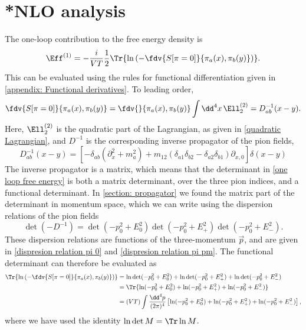 \section{*NLO analysis}

The one-loop contribution to the free energy density is
%
\begin{equation}
    \label{one loop free energy}
    \Eff^{(1)}
    = - \frac{i}{V T} \frac{1}{2}
    \Tr{\ln\left( -\fdv{S[\pi = 0]}{\pi_a(x), \pi_b(y)} \right)}.
\end{equation}
%
This can be evaluated using the rules for functional differentiation given in \autoref{appendix: Functional derivatives}.
To leading order,
%
\begin{align}
    \fdv{S[\pi = 0]}{\pi_a(x), \pi_b(y)}
    = \fdv{}{\pi_a(x), \pi_b(y)}
    \int \dd^4 x \, \Ell^{(2)}_2
    = D_{ab}^{-1}(x - y).
\end{align}
%
Here, $\Ell^{(2)}_2$ is the quadratic part of the Lagrangian, as given in \autoref{quadratic Lagrangian}, and $D^{-1}$ is the corresponding inverse propagator of the pion fields,
\begin{equation}
    D_{ab}^{-1}(x-y) = 
    \left[
        - \delta_{ab}(\partial_x^2 + m^2_a)
        + m_{12}(\delta_{a1} \delta_{b2} - \delta_{a2}\delta_{b1}) \partial_{x, 0}
    \right] \delta(x-y)
\end{equation}
%
The inverse propagator is a matrix, which means that the determinant in \autoref{one loop free energy} is both a matrix determinant, over the three pion indices, and a functional determinant.
In \autoref{section: propagator} we found the matrix part of the determinant in momentum space, which we can write using the dispersion relations of the pion fields
\begin{equation}
    \det(- D^{-1}) = \det(-p_0^2 + E_0^2) \det(-p_0^2 + E_+^2) \det(-p_0^2 + E_-^2).
\end{equation}
%
These dispersion relations are functions of the three-momentum $\vec p$, and are given in \autoref{dispresion relation pi 0} and \autoref{dispresion relation pi pm}.
The functional determinant can therefore be evaluated as
%
\begin{align}
    \nonumber
    \Tr{\ln\left( -\fdv{S[\pi = 0]}{\pi_a(x), \pi_b(y)} \right)}
    & = \ln \det(-p_0^2 + E_0^2) + \ln \det(-p_0^2 + E_+^2) + \ln \det(-p_0^2 + E_-^2) \\
    \nonumber
    & = \Tr{ \ln(-p_0^2 + E_0^2) + \ln(-p_0^2 + E_+^2)+  \ln(-p_0^2 + E_-^2) } \\
    & = (VT) \int \frac{\dd^4 p}{(2 \pi)^4} 
    \left[ \ln(-p_0^2 + E_0^2) + \ln(-p_0^2 + E_+^2) + \ln(-p_0^2 + E_-^2)  \right],
\end{align}
%
where we have used the identity $\ln\det M = \Tr \ln M $.

